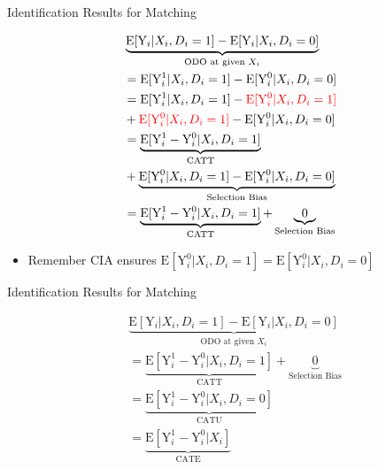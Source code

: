 \documentclass[hyperref={pdfpagelabels=false}]{beamer}
\begin{document}
\begin{frame}{Identification Results for Matching}

	
	\begin{equation*}
	\begin{aligned}
    & 
	\underbrace{\mathrm{E}[\mathrm{Y}_{i}|X_{i},D_{i}=1] - \mathrm{E}[\mathrm{Y}_{i}|X_{i},D_{i}=0]}_{\text{ODO at given $X_{i}$}}  \\
	&=\mathrm{E}[\mathrm{Y}^{1}_{i}|X_{i},D_{i}=1] - \mathrm{E}[\mathrm{Y}^{0}_{i}|X_{i},D_{i}=0] \\
	&= \mathrm{E}[\mathrm{Y}^{1}_{i}|X_{i},D_i=1]-{\color{red} \mathrm{E}[\mathrm{Y}^{0}_{i}|X_{i},D_i=1]} 
	\\
	& + {\color{red} \mathrm{E}[\mathrm{Y}^{0}_{i}|X_{i},D_i=1]}-\mathrm{E}[\mathrm{Y}^{0}_{i}|X_{i},D_i=0] \\
	&= \underbrace{\mathrm{E}[\mathrm{Y}^{1}_{i}-\mathrm{Y}^{0}_{i}|X_{i},D_i=1]}_{\text{CATT}} \\
	&+ \underbrace{\mathrm{E}[\mathrm{Y}^{0}_{i}|X_{i},D_i=1]-\mathrm{E}[\mathrm{Y}^{0}_{i}|X_{i},D_i=0]}_{\text{Selection Bias}} \\
	&= \underbrace{\mathrm{E}[\mathrm{Y}^{1}_{i}-\mathrm{Y}^{0}_{i}|X_{i},D_i=1]}_{\text{CATT}} + \underbrace{0}_{\text{Selection Bias}}  

	
	\end{aligned}
	\end{equation*}	
		\begin{itemize}	
		\item Remember CIA ensures $\mathrm{E}[\mathrm{Y}^{0}_{i}|X_{i},D_i=1] = \mathrm{E}[\mathrm{Y}^{0}_{i}|X_{i},D_i=0]$
		
		
	\end{itemize}
	
	
\end{frame}







\begin{frame}{Identification Results for Matching}

	
	\begin{equation*}
		\begin{aligned}
		& 
			\underbrace{\mathrm{E}[\mathrm{Y}_{i}|X_{i},D_{i}=1] - \mathrm{E}[\mathrm{Y}_{i}|X_{i},D_{i}=0]}_{\text{ODO at given $X_{i}$}}  \\
			&= \underbrace{\mathrm{E}[\mathrm{Y}^{1}_{i}-\mathrm{Y}^{0}_{i}|X_{i},D_i=1]}_{\text{CATT}} + \underbrace{0}_{\text{Selection Bias}}  \\
			&= \underbrace{\mathrm{E}[\mathrm{Y}^{1}_{i}-\mathrm{Y}^{0}_{i}|X_{i},D_i=0]}_{\text{CATU}} \\
			&= \underbrace{\mathrm{E}[\mathrm{Y}^{1}_{i}-\mathrm{Y}^{0}_{i}|X_{i}]}_{\text{CATE}}
			
		\end{aligned}
	\end{equation*}	
	
	
	\end{frame}
\end{document}
